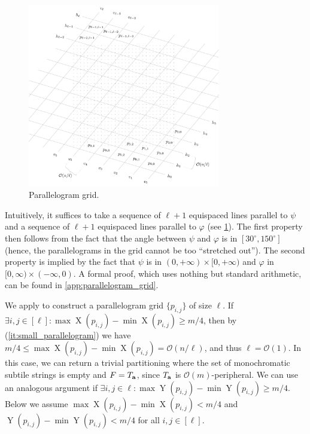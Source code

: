 \documentclass[11pt, letterpaper]{article}
\theoremstyle{plain}
\theoremstyle{definition}
\theoremstyle{remark}
\renewcommand{\O}{\mathcal{O}}
\renewcommand{\phi}{\varphi}
\DeclareMathOperator*{\X}{X}
\DeclareMathOperator*{\Y}{Y}
\begin{document}
\begin{figure}[h!]
        \centering
        \includegraphics[width=0.75\textwidth]{drawings/lemma5}
        \caption{Parallelogram grid.}
        \label{figure:lemma5}
\end{figure}

Intuitively, it suffices to take a sequence of $\ell+1$ equispaced lines parallel to $\psi$ and a sequence of $\ell+1$ equispaced lines parallel to $\phi$ (see \cref{figure:lemma5}). The first property then follows from the fact that the angle between $\psi$ and $\varphi$ is in $[30^\circ,150^\circ]$ (hence, the parallelograms in the grid cannot be too ``stretched out''). The second property is implied by the fact that $\psi$ is in $(0,+\infty)\times [0,+\infty)$ and $\phi$ in $[0,\infty) \times (-\infty,0)$. A formal proof, which uses nothing but standard arithmetic, can be found in \cref{app:parallelogram_grid}.  

We apply  to construct a parallelogram grid $\{p_{i,j}\}$ of size $\ell$. If $\exists i, j \in [\ell] : \max \X(p_{i, j}) - \min \X(p_{i, j}) \ge m / 4$, then by  (\ref{it:small_parallelogram}) we have $m / 4 \le \max \X(p_{i, j}) - \min \X(p_{i, j}) = \O(n / \ell)$, and thus $\ell = \O(1)$. In this case, we can return a trivial partitioning where the set of monochromatic subtile strings is empty and $F = T_\mathbf{a}$, since $T_\mathbf{a}$ is $\O(m)$-peripheral. We can use an analogous argument if $\exists i,j \in \ell : \max \Y(p_{i, j}) - \min \Y(p_{i, j}) \ge m / 4$. Below we assume $\max \X(p_{i, j}) - \min \X(p_{i, j}) < m / 4$ and $\Y(p_{i, j}) - \min \Y(p_{i, j}) < m / 4$ for all $i, j \in [\ell]$. 
\end{document}
